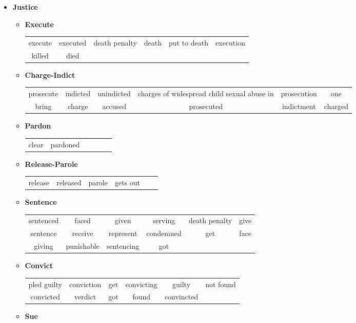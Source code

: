 \documentclass[11pt, oneside]{article}   	%
\begin{document}
\begin{itemize}
\clearpage
\item[] \textbf{Justice} 
	\vspace*{-0.2cm}
	\begin{itemize}
	\item[] \textbf{Execute} \\
		 \begin{tabular}{ c c c c c c }
		 execute & executed & death penalty & death & put to death & execution\\killed & died		\end{tabular}
	\item[] \textbf{Charge-Indict} \\
		 \begin{tabular}{ c c c c c c }	
		 prosecute & indicted & unindicted & charges of widespread child sexual abuse in & prosecution & one\\bring & charge & accused & prosecuted & indictment & charged
		 \end{tabular}
	\item[] \textbf{Pardon} \\
		 \begin{tabular}{ c c c c c c }	
		 clear & pardoned
		 \end{tabular}
	\item[] \textbf{Release-Parole} \\
		 \begin{tabular}{ c c c c c c }	
		 release & released & parole & gets out
		 \end{tabular} 
	\item[] \textbf{Sentence} \\
		 \begin{tabular}{ c c c c c c }	
		 sentenced & faced & given & serving & death penalty & give\\sentence & receive & represent & condemned & get & face\\giving & punishable & sentencing & got
		 \end{tabular} 
	\item[] \textbf{Convict} \\
		 \begin{tabular}{ c c c c c c }	
		 pled guilty & conviction & get & convicting & guilty & not found\\convicted & verdict & got & found & convincted
		 \end{tabular} 
	\item[] \textbf{Sue} \\
		 \begin{tabular}{ c c c c c c }	

\end{tabular}
\end{itemize}
\end{itemize}
\end{document}
